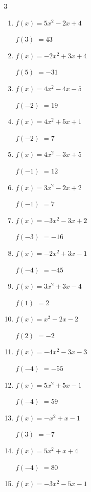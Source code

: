\begin{multicols}{3}
\begin{enumerate}
$f(1)$
        $= 9$

\columnbreak %

\resetques

  \item $f(x)=5x^{2}-2x+4$

$f(3)$
        $= 43$

  \item $f(x)=-2x^{2}+3x+4$

$f(5)$
        $= -31$

  \item $f(x)=4x^{2}-4x-5$

$f(-2)$
        $= 19$

  \item $f(x)=4x^{2}+5x+1$

$f(-2)$
        $= 7$

  \item $f(x)=4x^{2}-3x+5$

$f(-1)$
        $= 12$

  \item $f(x)=3x^{2}-2x+2$

$f(-1)$
        $= 7$

  \item $f(x)=-3x^{2}-3x+2$

$f(-3)$
        $= -16$

  \item $f(x)=-2x^{2}+3x-1$

$f(-4)$
        $= -45$

  \item $f(x)=3x^{2}+3x-4$

$f(1)$
        $= 2$

  \item $f(x)=x^{2}-2x-2$

$f(2)$
        $= -2$

  \item $f(x)=-4x^{2}-3x-3$

$f(-4)$
        $= -55$

  \item $f(x)=5x^{2}+5x-1$

$f(-4)$
        $= 59$

  \item $f(x)=-x^{2}+x-1$

$f(3)$
        $= -7$

  \item $f(x)=5x^{2}+x+4$

$f(-4)$
        $= 80$

  \item $f(x)=-3x^{2}-5x-1$


\end{enumerate}
\end{multicols}
